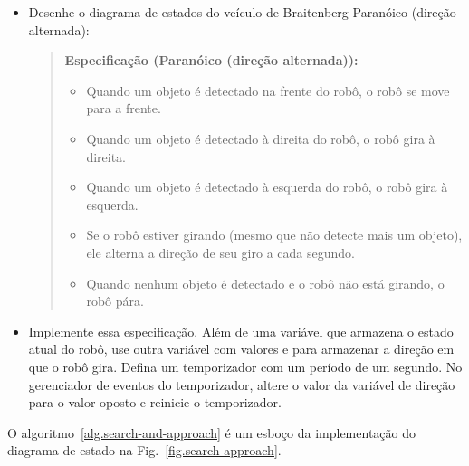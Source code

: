 \begin{framed}
\begin{itemize}
\item Desenhe o diagrama de estados do veículo de Braitenberg Paranóico (direção alternada):
\begin{quote}
\normalsize\noindent\textbf{Especificação (Paranóico (direção alternada)):}
\begin{itemize}
\item Quando um objeto é detectado na frente do robô, o robô se move para a frente.
\item Quando um objeto é detectado à direita do robô, o robô gira à direita. 
\item Quando um objeto é detectado à esquerda do robô, o robô gira à esquerda. 
\item Se o robô estiver girando (mesmo que não detecte mais um objeto), ele alterna a direção de seu giro a cada segundo.
\item Quando nenhum objeto é detectado e o robô não está girando, o robô pára. 
\end{itemize}
\end{quote}
\item Implemente essa especificação. Além de uma variável que armazena o estado atual do robô, use outra variável com valores  e  para armazenar a direção em que o robô gira. Defina um temporizador com um período de um segundo. No gerenciador de eventos do temporizador, altere o valor da variável de direção para o valor oposto e reinicie o temporizador.
\end{itemize}
\end{framed}

O algoritmo~\ref{alg.search-and-approach} é um esboço da implementação do diagrama de estado na Fig.~\ref{fig.search-approach}.

